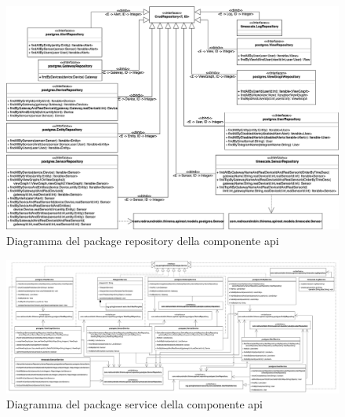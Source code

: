 		\begin{landscape}
		\begin{figure}[H]
			\centering
			\includegraphics[scale=0.550]{res/images/API/RepositoryPackage.png}
			\caption{Diagramma del package repository della componente api}
			\label{Diagramma 15}
		\end{figure}
		\begin{figure}[H]
			\centering
			\includegraphics[scale=0.300]{res/images/API/ServicePackage.png}
			\caption{Diagramma del package service della componente api}
			\label{Diagramma 16}
		\end{figure}
		

\end{landscape}
